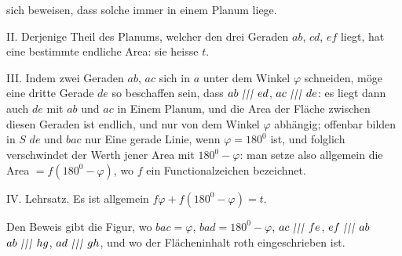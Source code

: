 %
sich beweisen, dass solche immer in einem Planum liege.
\begin{center}\end{center}
II. Derjenige Theil des Planums, welcher  den drei Geraden $ab$, $cd$, $ef$ liegt, hat eine bestimmte endliche Area: sie heisse $t$.

III. Indem zwei Geraden $ab$, $ac$ sich in $a$ unter dem Winkel $\varphi$ schneiden, möge eine dritte Gerade $de$ so beschaffen sein, dass $ab\TripleParallel ed$, $ac\TripleParallel de$: es liegt dann auch $de$ mit $ab$ und $ac$ in Einem Planum, und die Area der Fläche zwischen diesen Geraden ist endlich, und nur von dem Winkel $\varphi$ abhängig; offenbar bilden in $S$ $de$ und $bac$ nur Eine gerade Linie, wenn $\varphi=180^{0}$ ist, und folglich verschwindet der Werth jener Area mit $180^{0}-\varphi$: man setze also allgemein die Area $=f(180^{0}-\varphi)$, wo $f$ ein Functionalzeichen bezeichnet.
\begin{center}\end{center}

IV. Lehrsatz. Es ist allgemein $f\varphi+f(180^{0}-\varphi)=t$.
\begin{center}\end{center}
Den Beweis gibt die Figur, wo $bac=\varphi$, $bad=180^{0}-\varphi$, $ac\TripleParallel fe$, $ef\TripleParallel ab$ $ab\TripleParallel hg$, $ad\TripleParallel gh$, und wo der Flächeninhalt roth eingeschrieben ist.

